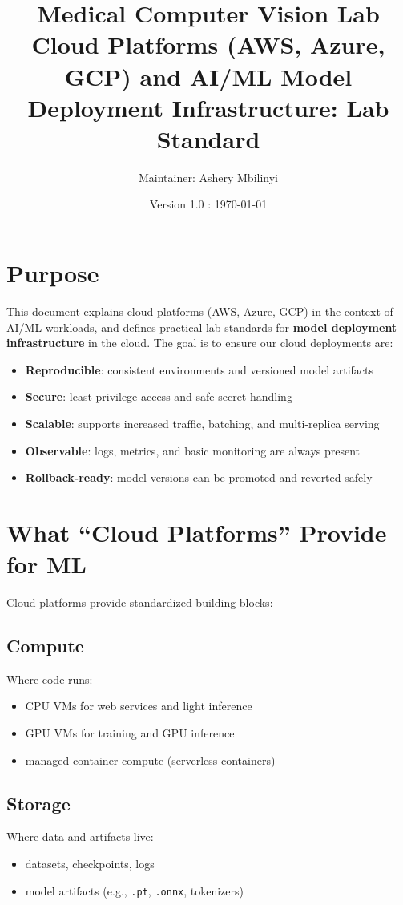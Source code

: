 \documentclass[11pt]{article}
\title{\textbf{Medical Computer Vision Lab \\ \small{
Cloud Platforms (AWS, Azure, GCP) and AI/ML Model Deployment Infrastructure: Lab Standard}}}
\author{Maintainer: Ashery Mbilinyi}
\date{Version 1.0 : \today}
\begin{document}
\maketitle

\tableofcontents
\newpage

\section{Purpose}
This document explains cloud platforms (AWS, Azure, GCP) in the context of AI/ML workloads, and defines practical lab standards for \textbf{model deployment infrastructure} in the cloud.
The goal is to ensure our cloud deployments are:
\begin{itemize}
  \item \textbf{Reproducible}: consistent environments and versioned model artifacts
  \item \textbf{Secure}: least-privilege access and safe secret handling
  \item \textbf{Scalable}: supports increased traffic, batching, and multi-replica serving
  \item \textbf{Observable}: logs, metrics, and basic monitoring are always present
  \item \textbf{Rollback-ready}: model versions can be promoted and reverted safely
\end{itemize}

\section{What ``Cloud Platforms'' Provide for ML}
Cloud platforms provide standardized building blocks:

\subsection{Compute}
Where code runs:
\begin{itemize}
  \item CPU VMs for web services and light inference
  \item GPU VMs for training and GPU inference
  \item managed container compute (serverless containers)
\end{itemize}

\subsection{Storage}
Where data and artifacts live:
\begin{itemize}
  \item datasets, checkpoints, logs
  \item model artifacts (e.g., \texttt{.pt}, \texttt{.onnx}, tokenizers)
\end{itemize}
\end{document}
